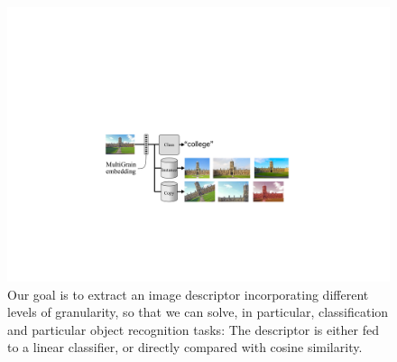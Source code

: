 \begin{figure}
\includegraphics[width=1.\linewidth]{figs/splash}
\vspace{-10pt}
\caption{Our goal is to extract an image descriptor incorporating different levels of granularity, so that we can solve, in particular, classification and particular object recognition tasks: The descriptor is either fed to a linear classifier, or directly compared with cosine similarity. 
%
\label{fig:splash}} 
\vspace{-10pt}
\end{figure}
